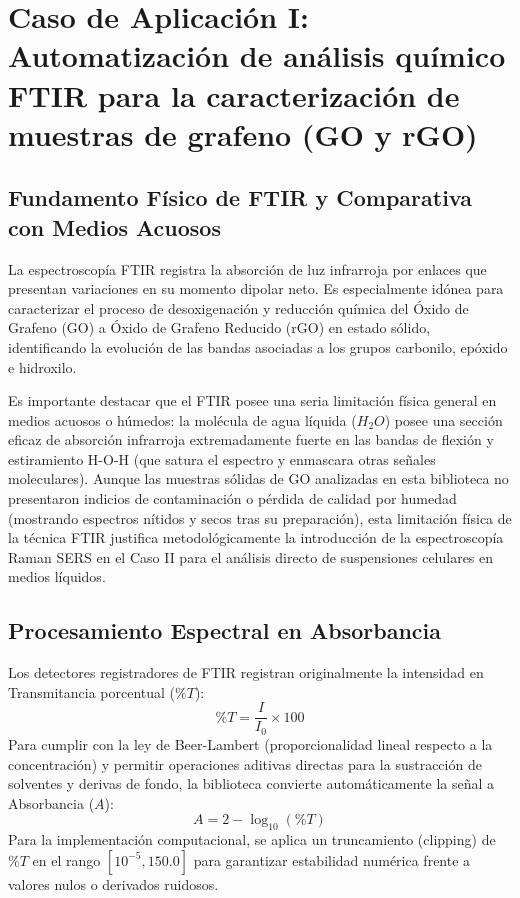 \section{Caso de Aplicación I: Automatización de análisis químico FTIR para la caracterización de muestras de grafeno (GO y rGO)}

\subsection{Fundamento Físico de FTIR y Comparativa con Medios Acuosos}
La espectroscopía FTIR registra la absorción de luz infrarroja por enlaces que presentan variaciones en su momento dipolar neto. Es especialmente idónea para caracterizar el proceso de desoxigenación y reducción química del Óxido de Grafeno (GO) a Óxido de Grafeno Reducido (rGO) en estado sólido, identificando la evolución de las bandas asociadas a los grupos carbonilo, epóxido e hidroxilo.

Es importante destacar que el FTIR posee una seria limitación física general en medios acuosos o húmedos: la molécula de agua líquida ($H_2O$) posee una sección eficaz de absorción infrarroja extremadamente fuerte en las bandas de flexión y estiramiento H-O-H (que satura el espectro y enmascara otras señales moleculares). Aunque las muestras sólidas de GO analizadas en esta biblioteca no presentaron indicios de contaminación o pérdida de calidad por humedad (mostrando espectros nítidos y secos tras su preparación), esta limitación física de la técnica FTIR justifica metodológicamente la introducción de la espectroscopía Raman SERS en el Caso II para el análisis directo de suspensiones celulares en medios líquidos.

\subsection{Procesamiento Espectral en Absorbancia}
Los detectores registradores de FTIR registran originalmente la intensidad en Transmitancia porcentual ($\%T$):
\begin{equation}
    \%T = \frac{I}{I_0} \times 100
\end{equation}
Para cumplir con la ley de Beer-Lambert (proporcionalidad lineal respecto a la concentración) y permitir operaciones aditivas directas para la sustracción de solventes y derivas de fondo, la biblioteca convierte automáticamente la señal a Absorbancia ($A$):
\begin{equation}
    A = 2 - \log_{10}(\%T)
\end{equation}
Para la implementación computacional, se aplica un truncamiento (clipping) de $\%T$ en el rango $[10^{-5}, 150.0]$ para garantizar estabilidad numérica frente a valores nulos o derivados ruidosos.

